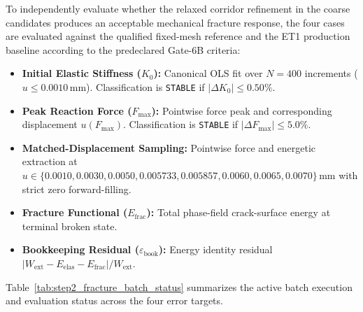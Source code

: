 To independently evaluate whether the relaxed corridor refinement in the coarse candidates produces an acceptable mechanical fracture response, the four cases are evaluated against the qualified fixed-mesh reference and the ET1 production baseline according to the predeclared Gate-6B criteria:
\begin{itemize}
  \item \textbf{Initial Elastic Stiffness ($K_0$):} Canonical OLS fit over $N=400$ increments ($u \le 0.0010\,\mathrm{mm}$). Classification is \texttt{STABLE} if $|\Delta K_0| \le 0.50\%$.
  \item \textbf{Peak Reaction Force ($F_{\max}$):} Pointwise force peak and corresponding displacement $u(F_{\max})$. Classification is \texttt{STABLE} if $|\Delta F_{\max}| \le 5.0\%$.
  \item \textbf{Matched-Displacement Sampling:} Pointwise force and energetic extraction at $u \in \{0.0010, 0.0030, 0.0050, 0.005733, 0.005857, 0.0060, 0.0065, 0.0070\}\,\mathrm{mm}$ with strict zero forward-filling.
  \item \textbf{Fracture Functional ($E_{\mathrm{frac}}$):} Total phase-field crack-surface energy at terminal broken state.
  \item \textbf{Bookkeeping Residual ($\varepsilon_{\mathrm{book}}$):} Energy identity residual $|W_{\mathrm{ext}} - E_{\mathrm{elas}} - E_{\mathrm{frac}}| / W_{\mathrm{ext}}$.
\end{itemize}

Table~\ref{tab:step2_fracture_batch_status} summarizes the active batch execution and evaluation status across the four error targets.

